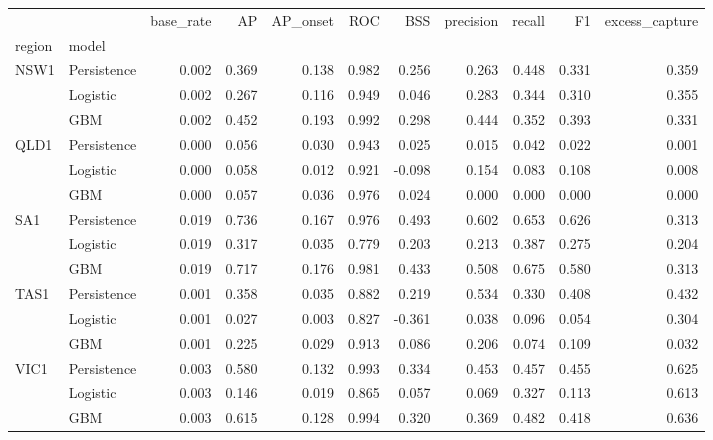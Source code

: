 \begin{tabular}{llrrrrrrrrr}
\toprule
 & & base\_rate & AP & AP\_onset & ROC & BSS & precision & recall & F1 & excess\_capture \\
region & model & & & & & & & & & \\
\midrule
\multirow[t]{3}{*}{NSW1} & Persistence & 0.002 & 0.369 & 0.138 & 0.982 & 0.256 & 0.263 & 0.448 & 0.331 & 0.359 \\
 & Logistic & 0.002 & 0.267 & 0.116 & 0.949 & 0.046 & 0.283 & 0.344 & 0.310 & 0.355 \\
 & GBM & 0.002 & 0.452 & 0.193 & 0.992 & 0.298 & 0.444 & 0.352 & 0.393 & 0.331 \\
\cline{1-11}
\multirow[t]{3}{*}{QLD1} & Persistence & 0.000 & 0.056 & 0.030 & 0.943 & 0.025 & 0.015 & 0.042 & 0.022 & 0.001 \\
 & Logistic & 0.000 & 0.058 & 0.012 & 0.921 & -0.098 & 0.154 & 0.083 & 0.108 & 0.008 \\
 & GBM & 0.000 & 0.057 & 0.036 & 0.976 & 0.024 & 0.000 & 0.000 & 0.000 & 0.000 \\
\cline{1-11}
\multirow[t]{3}{*}{SA1} & Persistence & 0.019 & 0.736 & 0.167 & 0.976 & 0.493 & 0.602 & 0.653 & 0.626 & 0.313 \\
 & Logistic & 0.019 & 0.317 & 0.035 & 0.779 & 0.203 & 0.213 & 0.387 & 0.275 & 0.204 \\
 & GBM & 0.019 & 0.717 & 0.176 & 0.981 & 0.433 & 0.508 & 0.675 & 0.580 & 0.313 \\
\cline{1-11}
\multirow[t]{3}{*}{TAS1} & Persistence & 0.001 & 0.358 & 0.035 & 0.882 & 0.219 & 0.534 & 0.330 & 0.408 & 0.432 \\
 & Logistic & 0.001 & 0.027 & 0.003 & 0.827 & -0.361 & 0.038 & 0.096 & 0.054 & 0.304 \\
 & GBM & 0.001 & 0.225 & 0.029 & 0.913 & 0.086 & 0.206 & 0.074 & 0.109 & 0.032 \\
\cline{1-11}
\multirow[t]{3}{*}{VIC1} & Persistence & 0.003 & 0.580 & 0.132 & 0.993 & 0.334 & 0.453 & 0.457 & 0.455 & 0.625 \\
 & Logistic & 0.003 & 0.146 & 0.019 & 0.865 & 0.057 & 0.069 & 0.327 & 0.113 & 0.613 \\
 & GBM & 0.003 & 0.615 & 0.128 & 0.994 & 0.320 & 0.369 & 0.482 & 0.418 & 0.636 \\
\cline{1-11}
\bottomrule
\end{tabular}